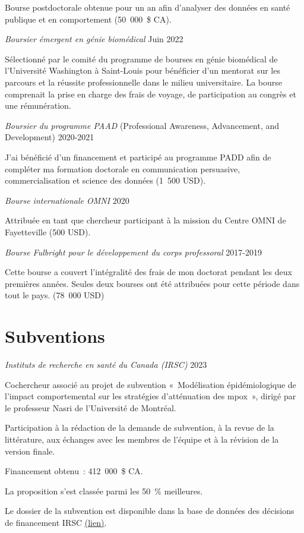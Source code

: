 \documentclass[10pt,]{article}
\begin{document}
Bourse postdoctorale obtenue pour un an afin d'analyser des données en
santé publique et en comportement (50~000~\$ CA).

\emph{Boursier émergent en génie biomédical} \hfill Juin 2022

Sélectionné par le comité du programme de bourses en génie biomédical de
l'Université Washington à Saint-Louis pour bénéficier d'un mentorat sur
les parcours et la réussite professionnelle dans le milieu
universitaire. La bourse comprenait la prise en charge des frais de
voyage, de participation au congrès et une rémunération.

\emph{Boursier du programme PAAD} (Professional Awareness, Advancement,
and Development) \hfill 2020-2021

J'ai bénéficié d'un financement et participé au programme PADD afin de
compléter ma formation doctorale en communication persuasive,
commercialisation et science des données (1~500 USD).

\emph{Bourse internationale OMNI} \hfill 2020

Attribuée en tant que chercheur participant à la mission du Centre OMNI
de Fayetteville (500 USD).

\emph{Bourse Fulbright pour le développement du corps professoral}
\hfill 2017-2019

Cette bourse a couvert l'intégralité des frais de mon doctorat pendant
les deux premières années. Seules deux bourses ont été attribuées pour
cette période dans tout le pays. (78~000 USD)

\section{Subventions}\label{subventions}

\emph{Instituts de recherche en santé du Canada (IRSC)} \hfill 2023

Cochercheur associé au projet de subvention «~Modélisation
épidémiologique de l'impact comportemental sur les stratégies
d'atténuation des mpox~», dirigé par le professeur Nasri de l'Université
de Montréal.

Participation à la rédaction de la demande de subvention, à la revue de
la littérature, aux échanges avec les membres de l'équipe et à la
révision de la version finale.

Financement obtenu~: 412~000~\$ CA.

La proposition s'est classée parmi les 50~\% meilleures.

Le dossier de la subvention est disponible dans la base de données des
décisions de financement IRSC
\href{https://webapps.cihr-irsc.gc.ca/decisions/p/project_details.html?applId=481271&lang=en}{(lien)}.
\end{document}
